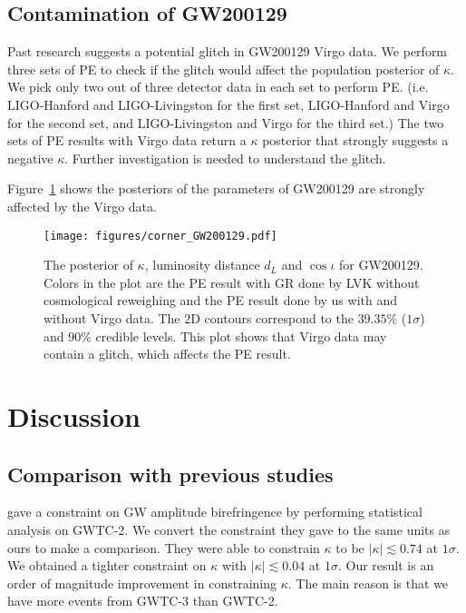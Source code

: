 \documentclass[aps,prd,twocolumn,superscriptaddress,preprintnumbers,floatfix,nofootinbib]{revtex4-2}
\begin{document}
\subsection{Contamination of GW200129}
\label{sec:GW200129}
Past research suggests a potential glitch in GW200129 Virgo data. \citep{GW200129_glitch}
We perform three sets of \ac{PE} to check if the glitch would affect the population posterior of $\kappa$.
We pick only two out of three detector data in each set to perform \ac{PE}. (i.e. LIGO-Hanford and LIGO-Livingston for the first set, LIGO-Hanford and Virgo for the second set, and LIGO-Livingston and Virgo for the third set.)
The two sets of \ac{PE} results with Virgo data return a $\kappa$ posterior that strongly suggests a negative $\kappa$.
Further investigation is needed to understand the glitch.

Figure~\ref{fig:corner_GW200129} shows the posteriors of the parameters of GW200129 are strongly affected by the Virgo data.

\begin{figure}
    \texttt{[image: figures/corner\_GW200129.pdf]}
    \caption{
        The posterior of $\kappa$, luminosity distance $d_L$ and $\cos{\iota}$ for GW200129.
        Colors in the plot are the \ac{PE} result with GR done by LVK without cosmological reweighing \citep{GWTC-2.1, GWTC-3, GWTC-2.1_dataset, GWTC-3_dataset} and the \ac{PE} result done by us with and without Virgo data.
        The 2D contours correspond to the $39.35\%$ ($1\sigma$) and $90\%$ credible levels.
        This plot shows that Virgo data may contain a glitch, which affects the \ac{PE} result.
    }
    \label{fig:corner_GW200129}
\end{figure}

\section{Discussion}
\label{sec:Discussion}

\subsection{Comparison with previous studies}
\citet{Okounkova_2022} gave a constraint on GW amplitude birefringence by performing statistical analysis on GWTC-2.
We convert the constraint they gave to the same units as ours to make a comparison.
They were able to constrain $\kappa$ to be $|\kappa| \lesssim 0.74$ at $1 \sigma$.
We obtained a tighter constraint on $\kappa$ with $|\kappa| \lesssim 0.04$ at $1 \sigma$.
Our result is an order of magnitude improvement in constraining $\kappa$.
The main reason is that we have more events from GWTC-3 than GWTC-2.
\end{document}
